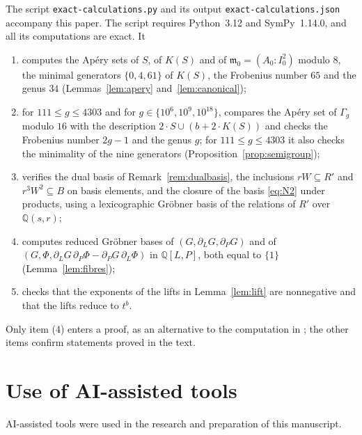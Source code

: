 \documentclass{amsart}
\theoremstyle{definition}
\theoremstyle{remark}
\numberwithin{equation}{section}
\newcommand{\m}{\mathfrak{m}}
\begin{document}
The script \texttt{exact-calculations.py} and its output \texttt{exact-calculations.json} accompany this paper. The script requires Python~3.12 and SymPy~1.14.0, and all its computations are exact. It
\begin{enumerate}
\item computes the Ap\'ery sets of $S$, of $K(S)$ and of $\m_0=(A_0:I_0^2)$ modulo $8$, the minimal generators $\{0,4,61\}$ of $K(S)$, the Frobenius number $65$ and the genus $34$ (Lemmas~\ref{lem:apery} and~\ref{lem:canonical});
\item for $111\le g\le 4303$ and for $g\in\{10^6,10^9,10^{18}\}$, compares the Ap\'ery set of $\Gamma_g$ modulo $16$ with the description $2\cdot S\cup(b+2\cdot K(S))$ and checks the Frobenius number $2g-1$ and the genus $g$; for $111\le g\le 4303$ it also checks the minimality of the nine generators (Proposition~\ref{prop:semigroup});
\item verifies the dual basis of Remark~\ref{rem:dualbasis}, the inclusions $rW\subseteq R'$ and $r^3W^2\subseteq B$ on basis elements, and the closure of the basis \eqref{eq:N2} under products, using a lexicographic Gr\"obner basis of the relations of $R'$ over $\mathbb Q(s,r)$;
\item computes reduced Gr\"obner bases of $(G,\partial_LG,\partial_PG)$ and of $(G,\Phi,\partial_LG\,\partial_P\Phi-\partial_PG\,\partial_L\Phi)$ in $\mathbb Q[L,P]$, both equal to $\{1\}$ (Lemma~\ref{lem:fibres});
\item checks that the exponents of the lifts in Lemma~\ref{lem:lift} are nonnegative and that the lifts reduce to $t^b$.
\end{enumerate}
Only item (4) enters a proof, as an alternative to the computation in \cite[Example~2.13]{Ste}; the other items confirm statements proved in the text.

\section*{Use of AI-assisted tools}

AI-assisted tools were used in the research and preparation of this manuscript.
\end{document}
